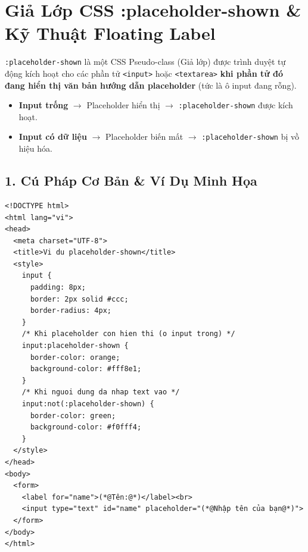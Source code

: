 \documentclass[11pt,oneside]{book}
\newcommand{\codeinline}[1]{\textcolor{accentOrange}{\texttt{#1}}}
\begin{document}
\section{Giả Lớp CSS :placeholder-shown \& Kỹ Thuật Floating Label}
\label{sec:css_placeholder_shown}

\begin{conceptBox}
\codeinline{:placeholder-shown} là một CSS Pseudo-class (Giả lớp) được trình duyệt tự động kích hoạt cho các phần tử \codeinline{<input>} hoặc \codeinline{<textarea>} \textbf{khi phần tử đó đang hiển thị văn bản hướng dẫn placeholder} (tức là ô input đang rỗng).
\par\vspace{4pt}
\begin{itemize}[leftmargin=1.5em, itemsep=2pt, parsep=0pt]
    \item \textbf{Input trống} $\rightarrow$ Placeholder hiển thị $\rightarrow$ \codeinline{:placeholder-shown} được kích hoạt.
    \item \textbf{Input có dữ liệu} $\rightarrow$ Placeholder biến mất $\rightarrow$ \codeinline{:placeholder-shown} bị vồ hiệu hóa.
\end{itemize}
\end{conceptBox}

\subsection{1. Cú Pháp Cơ Bản \& Ví Dụ Minh Họa}

\begin{codeWindow}
\begin{lstlisting}[language=HTML5]
<!DOCTYPE html>
<html lang="vi">
<head>
  <meta charset="UTF-8">
  <title>Vi du placeholder-shown</title>
  <style>
    input {
      padding: 8px;
      border: 2px solid #ccc;
      border-radius: 4px;
    }
    /* Khi placeholder con hien thi (o input trong) */
    input:placeholder-shown {
      border-color: orange;
      background-color: #fff8e1;
    }
    /* Khi nguoi dung da nhap text vao */
    input:not(:placeholder-shown) {
      border-color: green;
      background-color: #f0fff4;
    }
  </style>
</head>
<body>
  <form>
    <label for="name">(*@Tên:@*)</label><br>
    <input type="text" id="name" placeholder="(*@Nhập tên của bạn@*)">
  </form>
</body>
</html>
\end{lstlisting}
\end{codeWindow}
\end{document}

